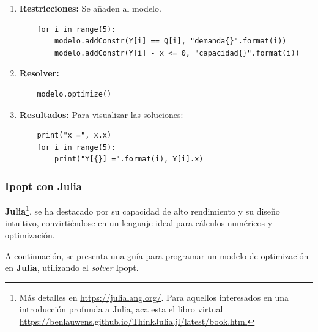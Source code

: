 \begin{enumerate}
    \item \textbf{Restricciones:} Se añaden al modelo.

    \begin{footnotesize}
    \begin{lstlisting}
    for i in range(5):
        modelo.addConstr(Y[i] == Q[i], "demanda{}".format(i))
        modelo.addConstr(Y[i] - x <= 0, "capacidad{}".format(i))
    \end{lstlisting}
    \end{footnotesize}
    
    \item \textbf{Resolver:}

    \begin{footnotesize}
    \begin{lstlisting}
    modelo.optimize()
    \end{lstlisting}
    \end{footnotesize}
    
    \item \textbf{Resultados:} Para visualizar las soluciones:

    \begin{footnotesize}
    \begin{lstlisting}
    print("x =", x.x)
    for i in range(5):
        print("Y[{}] =".format(i), Y[i].x)
    \end{lstlisting}
    \end{footnotesize}
\end{enumerate}

\subsubsection{Ipopt con Julia}

\textbf{Julia}\footnote{Más detalles en \url{https://julialang.org/}. Para aquellos interesados en una introducción profunda a Julia, aca esta el libro virtual \url{https://benlauwens.github.io/ThinkJulia.jl/latest/book.html}}, se ha destacado por su capacidad de alto rendimiento y su diseño intuitivo, convirtiéndose en un lenguaje ideal para cálculos numéricos y optimización.
\vspace{2.5mm}

A continuación, se presenta una guía para programar un modelo de optimización en \textbf{Julia}, utilizando el \textit{solver} Ipopt.

